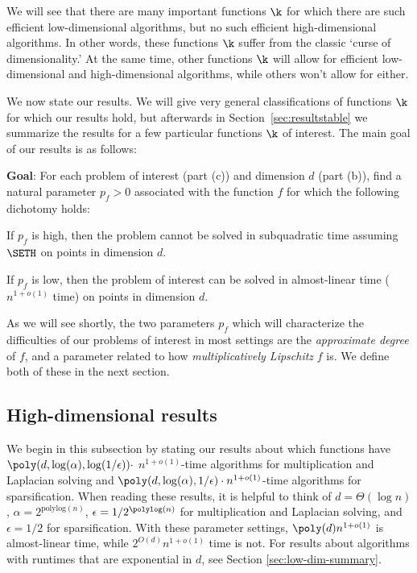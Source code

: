 We will see that there are many important functions $\k$ for which there
are such efficient low-dimensional algorithms, but no such efficient
high-dimensional algorithms. In other words, these functions $\k$ suffer
from the classic `curse of dimensionality.' At the same time, other
functions $\k$ will allow for efficient low-dimensional and
high-dimensional algorithms, while others won't allow for either.

We now state our results. We will give very general classifications of
functions $\k$ for which our results hold, but afterwards in
Section~\ref{sec:resultstable} we summarize the results for a few
particular functions $\k$ of interest. The main goal of our results is
as follows:


\textbf{Goal}: For each problem of interest (part (c)) and dimension $d$
(part (b)), find a natural parameter $p_f > 0$ associated with the
function $f$ for which the following dichotomy holds:

\begin{tight_itemize} \item If $p_f$ is high, then the problem cannot be
solved in subquadratic time assuming $\SETH$ on points in dimension $d$.
\item If $p_f$ is low, then the problem of interest can be solved in
almost-linear time ($n^{1+o(1)}$ time) on points in dimension $d$.
\end{tight_itemize}



As we will see shortly, the two parameters $p_f$ which will characterize
the difficulties of our problems of interest in most settings are the
\emph{approximate degree} of $f$, and a parameter related to how
\emph{multiplicatively Lipschitz} $f$ is. We define both of these in the
next section.



\subsection{High-dimensional results}\label{subsubsec:highdimmult}

We begin in this subsection by stating our results about which functions
have $\poly(d,\log(\alpha),\log(1/\epsilon)) \cdot$ $n^{1+o(1)}$-time
algorithms for multiplication and Laplacian solving and
$\poly(d,\log(\alpha),1/\epsilon)\cdot n^{1+o(1)}$-time algorithms for
sparsification. When reading these results, it is helpful to think of $d
= \Theta(\log n)$, $\alpha = 2^{\text{polylog}(n)}$, $\epsilon =
1/2^{\polylog(n)}$ for multiplication and Laplacian solving, and
$\epsilon = 1/2$ for sparsification. With these parameter settings,
  $\poly(d)n^{1+o(1)}$ is almost-linear time, while $2^{O(d)}n^{1+o(1)}$
  time is not. For results about algorithms with runtimes that are
  exponential in $d$, see 
  Section \ref{sec:low-dim-summary}.

